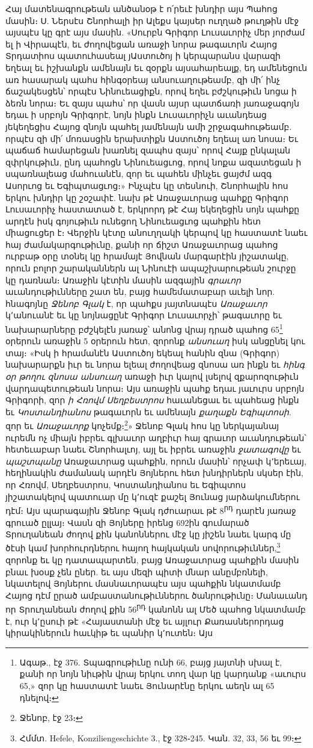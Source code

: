 \documentclass{article}
\begin{document}
{Հայ մատենագրութեան անծանօթ է ո՛րեւէ խնդիր այս Պահոց մասին։ Ս. Ներսէս Շնորհալի իր Ալեքս կայսեր ուղղած թուղթին մէջ այսպէս կը գրէ այս մասին. «Սուրբն Գրիգոր Լուսաւորիչ մեր յորժամ ել ի Վիրապէն, եւ ժողովեցան առաջի նորա թագաւորն Հայոց Տրդատիոս պատուհասեալ յԱստուծոյ ի կերպարանս վարազի եղեալ եւ իշխանքն ամենայն եւ զօրքն այսահարեալք, եդ ամենեցուն առ հասարակ պահս հինգօրեայ անսուաղութեամբ, զի մի՛ ինչ ճաշակեսցեն՝ որպէս Նինուեացիքն, որով եղեւ բժշկութիւն նոցա ի ձեռն նորա։ Եւ զայս պահս՝ որ վասն այսր պատճառի յառաջագոյն եդաւ ի սրբոյն Գրիգորէ, նոյն ինքն Լուսաւորիչն աւանդեաց յեկեղեցիս Հայոց զնոյն պահել յամենայն ամի շրջագահութեամբ. որպէս զի մի՛ մոռասցին երախտիքն Աստուծոյ եղեալ առ նոսա։ Եւ պաճաճ համարեցան խառնել զապհս զայս՝ որով Հայք ընկալան զփրկութիւն, ընդ պահոցն Նինուեացւոց, որով նոքա ազատեցան ի սպառնալեաց մահուանէն, զոր եւ պահեն մինչեւ ցայժմ ազգ Ասորւոց եւ Եգիպտացւոց։» Ինչպէս կը տեսնուի, Շնորհալին հոս երկու խնդիր կը շօշափէ. նախ թէ Առաջաւորաց պահքը Գրիգոր Լուսաւորիչ հաստատած է, երկրորդ թէ Հայ եկեղեցին սոյն պահքը արդէն իսկ գոյութիւն ունեցող Նինուեացւոց պահքին հետ միացուցեր է։ Վերջին կէտը անուղղակի կերպով կը հաստատէ նաեւ հայ ժամակարգութիւնը, քանի որ ճիշտ Առաջաւորաց պահոց ուրբաթ օրը տօնել կը հրամայէ Յովնան մարգարէին յիշատակը, որուն բոլոր շարականներն ալ Նինուէի ապաշխարութեան շուրջը կը դառնան։ Առաջին կէտին մասին ազգային \emph{գրաւոր} աւանդութիւնները շատ են, բայց համեմատաբար աւելի նոր. հնագոյնը \emph{Ջենոբ Գլակ} է, որ պահքս յայտնապէս \emph{Առաջաւոր} կ՚անուանէ եւ կը նոյնացընէ Գրիգոր Լուսաւորչի՝ թագաւորը եւ նախարարները բժշկելէն յառաջ՝ անոնց վրայ դրած պահոց 65\footnote{Ագաթ., էջ 376. Տպագրութիւնը ունի 66, բայց յայտնի սխալ է, քանի որ նոյն նիւթին վրայ երկու տող վար կը կարդանք «աւուրս 65,» զոր կը հաստատէ նաեւ Յունարէնը երկու աեղն ալ 65 դնելով։} օրերուն առաջին 5 օրերուն հետ, զորոնք \emph{անսուաղ} իսկ անցընել կու տայ։ «Իսկ ի հրամանէն Աստուծոյ եկեալ հանին զնա (Գրիգոր) նախարարքն իւր եւ նորա ելեալ ժողովեաց զնոսա առ ինքն եւ \emph{հինգ օր թողու զնոսա անսուաղ} առաջի իւր կալով լսելով զքարոզութիւն վարդապետութեան նորա։ Այս առաջին պահք եդաւ յաւուրս սրբոյն Գրիգորի, զոր \emph{ի Հռովմ Սեղբեստրոս} հաւանեցաւ եւ պահեաց ինքն եւ \emph{Կոստանդիանոս} թագաւորն եւ ամենայն \emph{քաղաքն Եգիպտոսի}. զոր եւ \emph{Առաջաւորք} կոչեմք։\footnote{Ջենոբ, էջ 23։}» Ջենոբ Գլակ հոս կը ներկայանայ ուրեմն ոչ միայն իբրեւ գլխաւոր աղբիւր հայ գրաւոր աւանդութեան՝ հետեւաբար նաեւ Շնորհալւոյ, այլ եւ իբրեւ առաջին \emph{ջատագովը} եւ \emph{պաշտպանը} Առաջաւորաց պահքին, որուն մասին՝ որչափ կ՚երեւայ, հեղինակին ժամանակ արդէն Յոյներու հետ խնդիրներն սկսեր էին, որ Հռովմ, Սեղբեստրոս, Կոստանդիանոս եւ Եգիպտոս յիշատակելով պատուար մը կ՚ուզէ քաշել Յունաց յարձակումներու դէմ։ Այս պարագային Ջենոբ Գլակ դժուարաւ թէ 8\textsuperscript{րդ} դարէն յառաջ գրուած ըլլայ։ Վասն զի Յոյները իրենց 692ին գումարած Տրուղանեան ժողով քին կանոններու մէջ կը յիշեն նաեւ կարգ մը ծէսի կամ խորհուրդներու հայող հայկական սովորութիւններ,\footnote{Հմմտ. Hefele, Konziliengeschichte 3., էջ 328֊245. Կան. 32, 33, 56 եւ 99։} զորոնք եւ կը դատապարտեն, բայց Առաջաւորաց պահքին մասին բնաւ խօսք չեն ըներ. եւ այս մեզի պիտի մնար անըմբռնելի, նկատելով Յոյներու մասնաւորապէս այս պահքին նկատմամբ Հայոց դէմ ըրած ամբաստանութիւններու ծանրութիւնը։ Մանաւանդ որ Տրուղանեան ժողով քին 56\textsuperscript{րդ} կանոնն ալ Մեծ պահոց նկատմամբ է, ուր կ՚ըսուի թէ «Հայաստանի մէջ եւ այլուր Քառասներորդաց կիրակիներուն հաւկիթ եւ պանիր կ՚ուտեն։ Այս }
\end{document}
